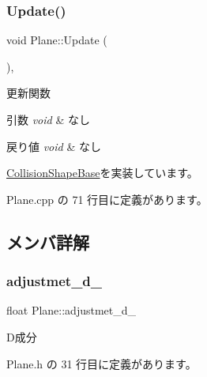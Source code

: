 \subsubsection{\texorpdfstring{Update()}{Update()}}
{\footnotesize\ttfamily void Plane\+::\+Update (\begin{DoxyParamCaption}{ }\end{DoxyParamCaption})\hspace{0.3cm}{\ttfamily [override]}, {\ttfamily [virtual]}}



更新関数 


\begin{DoxyParams}{引数}
{\em void} & なし \\
\hline
\end{DoxyParams}

\begin{DoxyRetVals}{戻り値}
{\em void} & なし \\
\hline
\end{DoxyRetVals}


\mbox{\hyperlink{class_collision_shape_base_a7aaa0f4de4e208f168f78e3445313929}{Collision\+Shape\+Base}}を実装しています。



 Plane.\+cpp の 71 行目に定義があります。



\subsection{メンバ詳解}
\mbox{\label{class_plane_ab43e3263bd879ea710936d85cacb6006}} 
\subsubsection{\texorpdfstring{adjustmet\+\_\+d\+\_\+}{adjustmet\_d\_}}
{\footnotesize\ttfamily float Plane\+::adjustmet\+\_\+d\+\_\+\hspace{0.3cm}{\ttfamily [private]}}



D成分 



 Plane.\+h の 31 行目に定義があります。

\mbox{\label{class_plane_a7ae74465500dfdd7a68fa2eb28486ae0}} 
